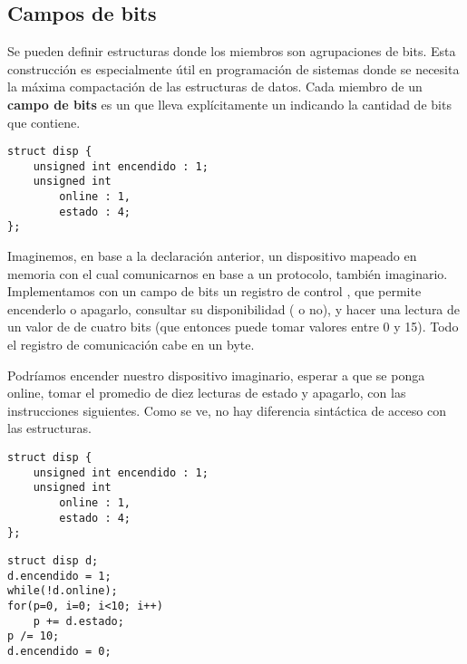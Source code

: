 \subsection{Campos de bits}
Se pueden definir estructuras donde los miembros son agrupaciones de bits. Esta
construcción es especialmente útil en programación de sistemas donde se
necesita la máxima compactación de las estructuras de datos. Cada miembro de un
\textbf{campo de bits} es un  que lleva explícitamente un  indicando
la cantidad de bits que contiene.
\begin{lstlisting}
struct disp {
    unsigned int encendido : 1;
    unsigned int
        online : 1,
        estado : 4;
};
\end{lstlisting}
\begin{ejemplo}
Imaginemos, en base a la declaración anterior, un dispositivo mapeado en memoria con el cual
comunicarnos en base a un protocolo, también imaginario. Implementamos con un
campo de bits un registro de control , que permite encenderlo o apagarlo,
consultar su disponibilidad ( o no), y hacer una lectura de un valor
de  de cuatro bits (que entonces puede tomar valores entre 0 y 15). Todo
el registro de comunicación cabe en un byte.

Podríamos encender nuestro dispositivo imaginario, esperar a que se ponga
online, tomar el promedio de diez lecturas de estado y apagarlo, con las
instrucciones siguientes. Como se ve, no hay diferencia sintáctica de acceso con las
estructuras.
\begin{lstlisting}
struct disp {
    unsigned int encendido : 1;
    unsigned int
        online : 1,
        estado : 4;
};
\end{lstlisting}

\begin{lstlisting}
struct disp d;
d.encendido = 1;
while(!d.online);
for(p=0, i=0; i<10; i++)
    p += d.estado;
p /= 10;
d.encendido = 0;
\end{lstlisting}
\end{ejemplo}


